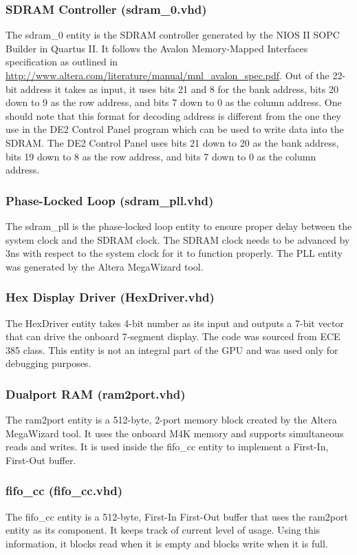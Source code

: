 \documentclass{report}
\begin{document}
\subsubsection{SDRAM Controller (sdram\_0.vhd)}
The sdram\_0 entity is the SDRAM controller generated by the NIOS II 
SOPC Builder in Quartus II. It follows the Avalon Memory-Mapped 
Interfaces specification as outlined in 
\url{http://www.altera.com/literature/manual/mnl\_avalon\_spec.pdf}. Out 
of the 22-bit address it takes as input, it uses bits 21 and 8 for the 
bank address, bits 20 down to 9 as the row address, and bits 7 down to 0 
as the column address. One should note that this format for decoding 
address is different from the one they use in the DE2 Control Panel 
program which can be used to write data into the SDRAM. The DE2 Control 
Panel uses bits 21 down to 20 as the bank address, bits 19 down to 8 as 
the row address, and bits 7 down to 0 as the column address.

\subsubsection{Phase-Locked Loop (sdram\_pll.vhd)}
The sdram\_pll is the phase-locked loop entity to ensure proper delay 
between the system clock and the SDRAM clock. The SDRAM clock needs to 
be advanced by 3ns with respect to the system clock for it to function 
properly. The PLL entity was generated by the Altera MegaWizard tool.

\subsubsection{Hex Display Driver (HexDriver.vhd)}
The HexDriver entity takes 4-bit number as its input and outputs a 7-bit 
vector that can drive the onboard 7-segment display. The code was 
sourced from ECE 385 class. This entity is not an integral part of the 
GPU and was used only for debugging purposes.

\subsubsection{Dualport RAM (ram2port.vhd)}
The ram2port entity is a 512-byte, 2-port memory block created by the 
Altera MegaWizard tool. It uses the onboard M4K memory and supports 
simultaneous reads and writes. It is used inside the fifo\_cc entity to 
implement a First-In, First-Out buffer.

\subsubsection{fifo\_cc (fifo\_cc.vhd)}
The fifo\_cc entity is a 512-byte, First-In First-Out buffer that uses 
the ram2port entity as its component. It keeps track of current level of 
usage. Using this information, it blocks read when it is empty and 
blocks write when it is full.
\end{document}
